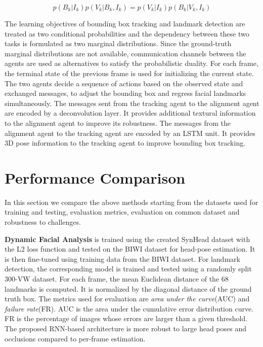 \documentclass{llncs}
\begin{document}
	\begin{equation}
	p\left(B_{k} | I_{k}\right) p\left(V_{k} | B_{k}, I_{k}\right)=p\left(V_{k} | I_{k}\right) p\left(B_{k} | V_{k}, I_{k}\right)
	\end{equation}
	
	The learning objectives of bounding box tracking and landmark detection are treated as two conditional probabilities and the dependency between these two tasks is formulated as two marginal distributions. Since the ground-truth marginal distributions are not available, communication channels between the agents are used as alternatives to satisfy the probabilistic duality. For each frame, the terminal state of the previous frame is used for initializing the current state. The two agents decide a sequence of actions based on the observed state and exchanged messages, to adjust the bounding box and regress facial landmarks simultaneously. The messages sent from the tracking agent to the alignment agent are encoded by a deconvolution layer. It provides additional textural information to the alignment agent to improve its robustness. The messages from the alignment agent to the tracking agent are encoded by an LSTM unit. It provides 3D pose information to the tracking agent to improve bounding box tracking.
	

	\vspace{-5mm}
	\section{Performance Comparison}
	In this section we compare the above methods starting from the datasets used for training and testing, evaluation metrics, evaluation on common dataset and robustness to challenges.
	
	\textbf{Dynamic Facial Analysis} \cite{dynamic_facial_analysis} is trained using the created SynHead dataset with the L2 loss function and tested on the BIWI dataset for head-pose estimation. It is then fine-tuned using training data from the BIWI dataset. For landmark detection, the corresponding model is trained and tested using a randomly split 300-VW dataset. For each frame, the mean Euclidean distance of the 68 landmarks is computed. It is normalized by the diagonal distance of the ground truth box. The metrics used for evaluation are \textit{area under the curve}(AUC) and \textit{failure rate}(FR). AUC is the area under the cumulative error distribution curve. FR is the percentage of images whose errors are larger than a given threshold. The proposed RNN-based architecture is more robust to large head poses and occlusions compared to per-frame estimation.
	
\end{document}
